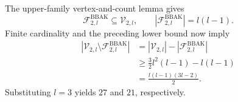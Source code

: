 The upper-family vertex-and-count lemma gives
\[
\mathcal F^{\mathrm{BBAK}}_{2,l}\subseteq\mathcal V_{2,l},\qquad |\mathcal F^{\mathrm{BBAK}}_{2,l}|=l(l-1).
\]
Finite cardinality and the preceding lower bound now imply
\[
\begin{aligned}
|\mathcal V_{2,l}\setminus\mathcal F^{\mathrm{BBAK}}_{2,l}|
&=|\mathcal V_{2,l}|-|\mathcal F^{\mathrm{BBAK}}_{2,l}|\\
&\ge\frac32l^2(l-1)-l(l-1)\\
&=\frac{l(l-1)(3l-2)}2.
\end{aligned}
\]
Substituting \(l=3\) yields \(27\) and \(21\), respectively.